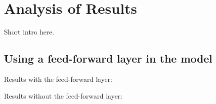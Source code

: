 \chapter{Analysis of Results}
Short intro here.

\section{Using a feed-forward layer in the model}

Results with the feed-forward layer:


Results without the feed-forward layer:



